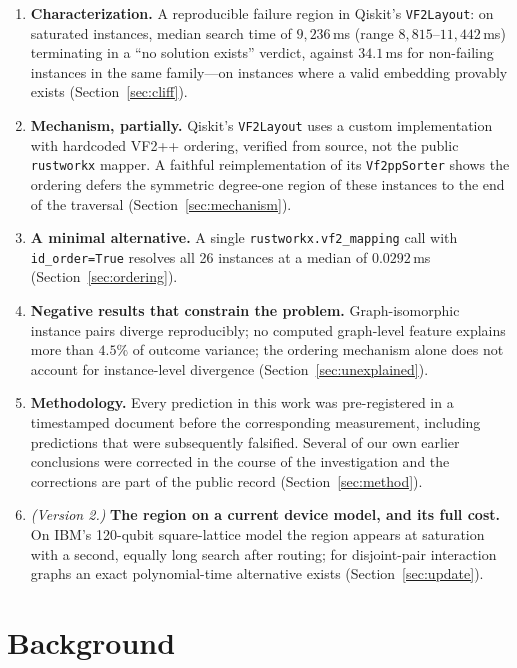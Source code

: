 \documentclass[11pt]{article}
\begin{document}
\begin{enumerate}
\item \textbf{Characterization.} A reproducible failure region in
Qiskit's \texttt{VF2Layout}: on saturated instances, median search time
of $9{,}236$\,ms (range $8{,}815$--$11{,}442$\,ms) terminating in a
``no solution exists'' verdict, against $34.1$\,ms for non-failing
instances in the same family---on instances where a valid embedding
provably exists (Section~\ref{sec:cliff}).

\item \textbf{Mechanism, partially.} Qiskit's \texttt{VF2Layout} uses a
custom implementation with hardcoded VF2++ ordering, verified from
source, not the public \texttt{rustworkx} mapper. A faithful
reimplementation of its \texttt{Vf2ppSorter} shows the ordering defers
the symmetric degree-one region of these instances to the end of the
traversal (Section~\ref{sec:mechanism}).

\item \textbf{A minimal alternative.} A single
\texttt{rustworkx.vf2\_mapping} call with \texttt{id\_order=True}
resolves all 26 instances at a median of $0.0292$\,ms
(Section~\ref{sec:ordering}).

\item \textbf{Negative results that constrain the problem.}
Graph-isomorphic instance pairs diverge reproducibly; no computed
graph-level feature explains more than $4.5\%$ of outcome variance;
the ordering mechanism alone does not account for instance-level
divergence (Section~\ref{sec:unexplained}).

\item \textbf{Methodology.} Every prediction in this work was
pre-registered in a timestamped document before the corresponding
measurement, including predictions that were subsequently falsified.
Several of our own earlier conclusions were corrected in the course of
the investigation and the corrections are part of the public record
(Section~\ref{sec:method}).

\item \emph{(Version 2.)} \textbf{The region on a current device model,
and its full cost.} On IBM's 120-qubit square-lattice model the region
appears at saturation with a second, equally long search after routing;
for disjoint-pair interaction graphs an exact polynomial-time
alternative exists (Section~\ref{sec:update}).
\end{enumerate}

\section{Background}
\end{document}

